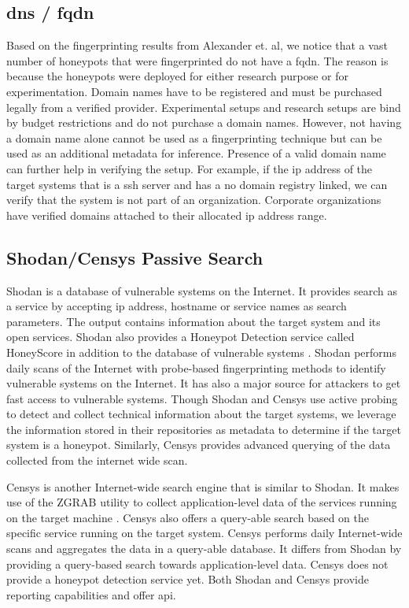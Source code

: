 \subsection{\acrshort{dns} / \acrfull{fqdn}}
Based on the fingerprinting results from Alexander et. al, we notice that a vast number of honeypots that were fingerprinted do not have a \acrfull{fqdn}. The reason is because the honeypots were deployed for either research purpose or for experimentation. Domain names have to be registered and must be purchased legally from a verified provider. Experimental setups and research setups are bind by budget restrictions and do not purchase a domain names. However, not having a domain name alone cannot be used as a fingerprinting technique but can be used as an additional metadata for inference. Presence of a valid domain name can further help in verifying the setup. For example, if the \acrshort{ip} address of the target systems that is a ssh server and has a no domain registry linked, we can verify that the system is not part of an organization. Corporate organizations have verified domains attached to their allocated \acrshort{ip} address range. 

\subsection{Shodan/Censys Passive Search}
Shodan is a database of vulnerable systems on the Internet. It provides search as a service by accepting \acrshort{ip} address, hostname or service names as search parameters. The output contains information about the target system and its open services. Shodan also provides a Honeypot Detection service called HoneyScore  in addition to the database of vulnerable systems \cite{SHODAN}. Shodan performs daily scans of the Internet with probe-based fingerprinting methods to identify vulnerable systems on the Internet. It has also a major source for attackers to get fast access to vulnerable systems. Though Shodan and Censys use active probing to detect and collect technical information about the target systems, we leverage the information stored in their repositories as metadata to determine if the target system is a honeypot. Similarly, Censys provides advanced querying of the data collected from the internet wide scan. 

Censys is another Internet-wide search engine that is similar to Shodan. It makes use of the ZGRAB  utility to collect application-level data of the services running on the target machine \cite{censys}. Censys also offers a query-able search based on the specific service running on the target system. Censys performs daily Internet-wide scans and aggregates the data in a query-able database. It differs from Shodan by providing a query-based search towards application-level data. Censys does not provide a honeypot detection service yet. Both Shodan and Censys provide reporting capabilities and offer \acrfull{api}. 


